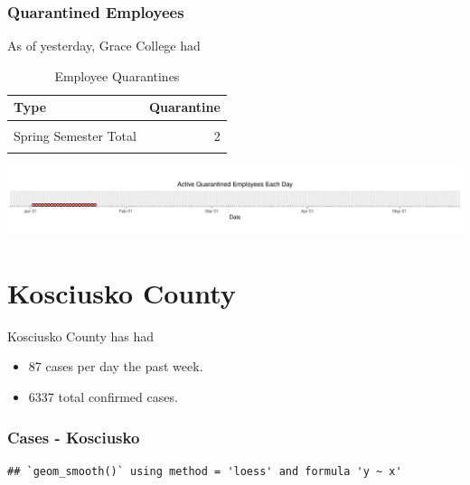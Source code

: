 \documentclass[
]{article}
\providecommand{\tightlist}{%
  \setlength{\itemsep}{0pt}\setlength{\parskip}{0pt}}
\begin{document}
\hypertarget{quarantined-employees}{%
\subsubsection{Quarantined Employees}\label{quarantined-employees}}

As of yesterday, Grace College had

\begin{table}[!h]

\caption{\label{tab:unnamed-chunk-12}Employee Quarantines}
\centering
\begin{tabular}[t]{lr}
\toprule
Type & Quarantine\\
\midrule
\cellcolor{gray!6}{Active on Tue Jan 12} & \cellcolor{gray!6}{1}\\
Spring Semester Total & 2\\
\cellcolor{gray!6}{20-21 Academic Year Total} & \cellcolor{gray!6}{58}\\
\bottomrule
\end{tabular}
\end{table}

\includegraphics{Grace_internal4_files/figure-latex/unnamed-chunk-13-1.pdf}

\newpage

\newpage

\hypertarget{kosciusko-county}{%
\section{Kosciusko County}\label{kosciusko-county}}

Kosciusko County has had

\begin{itemize}
\tightlist
\item
  87 cases per day the past week.
\item
  6337 total confirmed cases.
\end{itemize}

\hypertarget{cases---kosciusko}{%
\subsubsection{Cases - Kosciusko}\label{cases---kosciusko}}

\begin{verbatim}
## `geom_smooth()` using method = 'loess' and formula 'y ~ x'
\end{verbatim}
\end{document}
